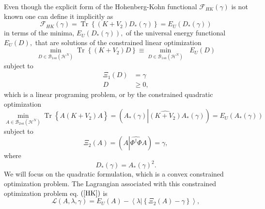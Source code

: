 \documentclass[aps,preprint]{revtex4}%
\begin{document}
Even though the explicit form of the Hohenberg-Kohn functional $\mathcal{F}%
_{HK}\left(  \gamma\right)  $ is not known one can define it implicitly
\cite{LevyLieb} as
\begin{equation}
\mathcal{F}_{HK}\left(  \gamma\right)  =\operatorname{Tr}\left\{  \left(
K+V_{2}\right)  D_{\ast}\left(  \gamma\right)  \right\}  =E_{U}\left(
D_{\ast}\left(  \gamma\right)  \right)
\end{equation}
in terms of the minima, $E_{U}\left(  D_{\ast}\left(  \gamma\right)  \right)
,$ of the universal energy functional $E_{U}\left(  D\right)  ,$ that are
solutions of the constrained linear optimization
\begin{equation}
\min_{D\in\mathcal{B}_{1sa}\left(  \mathcal{H}^{N}\right)  }\operatorname{Tr}%
\left\{  \left(  K+V_{2}\right)  D\right\}  \equiv\min_{D\in\mathcal{B}%
_{1sa}\left(  \mathcal{H}^{N}\right)  }\text{ }E_{U}\left(  D\right)
\label{HK}%
\end{equation}
subject to
\begin{align}
\Xi_{1}\left(  D\right)   &  =\gamma\nonumber\\
D  &  \geq0, \label{HKC}%
\end{align}
which is a linear programing problem, or by the constrained quadratic
optimization
\begin{equation}
\min_{A\in\mathcal{B}_{2sa}\left(  \mathcal{H}^{N}\right)  }\operatorname{Tr}%
\left\{  A\overset{}{\left(  K+V_{2}\right)  A}\right\}  =\left(  A_{\ast
}\left(  \gamma\right)  \left\vert \widehat{\left(  K+V_{2}\right)  }A_{\ast
}\left(  \gamma\right)  \right.  \right)  =E_{U}\left(  A_{\ast}\left(
\gamma\right)  \right)  \label{HKQ}%
\end{equation}
subject to
\begin{equation}
\Xi_{2}\left(  A\right)  =\left(  A\left\vert \widehat{\Phi^{\dagger}\Phi
}A\right.  \right)  =\gamma, \label{HKQC}%
\end{equation}
where
\begin{equation}
D_{\ast}\left(  \gamma\right)  =A_{\ast}\left(  \gamma\right)  ^{2}.
\end{equation}
We will focus on the quadratic formulation, which is a convex constrained
optimization problem. The Lagrangian associated with this constrained
optimization problem eq. $\left(  \ref{HK}\right)  $ is
\begin{equation}
\mathcal{L}\left(  A,\lambda,\gamma\right)  =E_{U}\left(  A\right)
-\left\langle \left.  \lambda\right\vert \left\{  \Xi_{2}\left(  A\right)
-\gamma\right\}  \right\rangle , \label{Lar}%
\end{equation}
\end{document}
